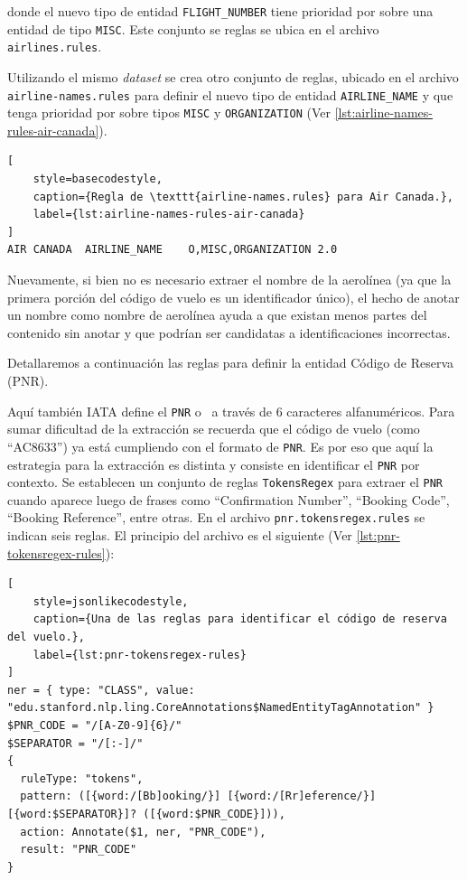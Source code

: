 donde el nuevo tipo de entidad \texttt{FLIGHT\_NUMBER} tiene prioridad por sobre una entidad de tipo \texttt{MISC}.
Este conjunto se reglas se ubica en el archivo \texttt{airlines.rules}.

Utilizando el mismo \textit{dataset} se crea otro conjunto de reglas, ubicado en el archivo \texttt{airline-names.rules}
para definir el nuevo tipo de entidad \texttt{AIRLINE\_NAME} y que tenga prioridad por sobre tipos \texttt{MISC} y
\texttt{ORGANIZATION} (Ver \autoref{lst:airline-names-rules-air-canada}).

\begin{lstlisting}[
    style=basecodestyle,
    caption={Regla de \texttt{airline-names.rules} para Air Canada.},
    label={lst:airline-names-rules-air-canada}
]
AIR CANADA	AIRLINE_NAME	O,MISC,ORGANIZATION	2.0
\end{lstlisting}

Nuevamente, si bien no es necesario extraer el nombre de la aerolínea (ya que la primera porción del código de vuelo
es un identificador único), el hecho de anotar un nombre como nombre de aerolínea ayuda a que existan menos partes del
contenido sin anotar y que podrían ser candidatas a identificaciones incorrectas.

Detallaremos a continuación las reglas para definir la entidad Código de Reserva (PNR).

Aquí también IATA define el \texttt{PNR} o~\cite{passenger-name-record} a través de 6
caracteres alfanuméricos.
Para sumar dificultad de la extracción se recuerda que el código de vuelo (como ``AC8633'') ya está cumpliendo con el
formato de \texttt{PNR}.
Es por eso que aquí la estrategia para la extracción es distinta y consiste en identificar el \texttt{PNR} por contexto.
Se establecen un conjunto de reglas \texttt{TokensRegex} para extraer el \texttt{PNR} cuando aparece luego de frases como
``Confirmation Number'', ``Booking Code'', ``Booking Reference'', entre otras.
En el archivo \texttt{pnr.tokensregex.rules} se indican seis reglas.
El principio del archivo es el siguiente (Ver \autoref{lst:pnr-tokensregex-rules}):

\begin{lstlisting}[
    style=jsonlikecodestyle,
    caption={Una de las reglas para identificar el código de reserva del vuelo.},
    label={lst:pnr-tokensregex-rules}
]
ner = { type: "CLASS", value: "edu.stanford.nlp.ling.CoreAnnotations$NamedEntityTagAnnotation" }
$PNR_CODE = "/[A-Z0-9]{6}/"
$SEPARATOR = "/[:-]/"
{
  ruleType: "tokens",
  pattern: ([{word:/[Bb]ooking/}] [{word:/[Rr]eference/}] [{word:$SEPARATOR}]? ([{word:$PNR_CODE}])),
  action: Annotate($1, ner, "PNR_CODE"),
  result: "PNR_CODE"
}
\end{lstlisting}

